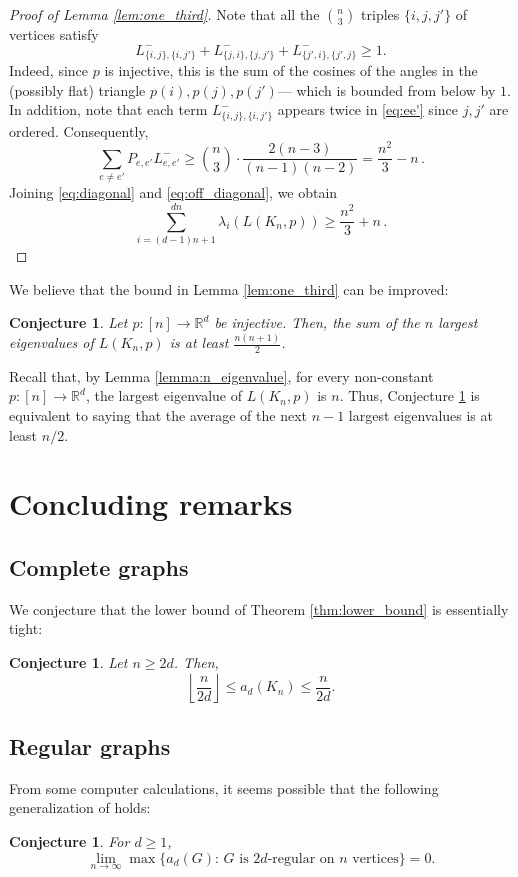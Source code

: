 \documentclass[a4paper,11pt]{article}
\theoremstyle{plain}
\newtheorem{conjecture}[theorem]{\bf Conjecture}
\theoremstyle{definition}
\newcommand{\Rea}{{\mathbb R}}
\newcommand{\lfrac}[2]{\left\lfloor\frac{#1}{#2}\right\rfloor}
\begin{document}
\begin{proof}[Proof of Lemma \ref{lem:one_third}]
Note that all the $\binom n3$ triples $\{i,j,j'\}$ of vertices satisfy
\[
L^-_{\{i,j\},\{i,j'\}}+L^-_{\{j,i\},\{j,j'\}}+L^-_{\{j',i\},\{j',j\}}\ge 1.
\]
Indeed, since $p$ is injective, this is the sum of the cosines of the angles in the (possibly flat) triangle $p(i),p(j),p(j')$--- which is bounded from below by $1$. In addition, note that each term $L^-_{\{i,j\},\{i,j'\}}$ appears twice in \eqref{eq:ee'} since $j,j'$ are ordered. Consequently,
\begin{equation}
\sum_{e\ne e'}P_{e,e'}L^-_{e,e'}\ge \binom{n}3 \cdot \frac{2(n-3)}{(n-1)(n-2)}=\frac{n^2}{3}-n\,.
\label{eq:off_diagonal}    
\end{equation}
Joining \eqref{eq:diagonal} and \eqref{eq:off_diagonal}, we obtain
\[
\sum_{i=(d-1)n+1}^{dn}\lambda_{i}(L(K_n,p))\geq 
\frac {n^2}3+n\,.
\]
\end{proof}


We believe that the bound in Lemma \ref{lem:one_third} can be improved:

\begin{conjecture}\label{conj:large_eigenvalues}
Let $p:[n]\to\Rea^d$ be injective. Then, the sum of the $n$ largest eigenvalues of $L(K_n,p)$ is at least $\frac{n(n+1)}{2}$.
\end{conjecture}

Recall that, by Lemma \ref{lemma:n_eigenvalue}, for every non-constant $p:[n]\to \Rea^d$, the largest eigenvalue of $L(K_n,p)$ is $n$. Thus, Conjecture \ref{conj:large_eigenvalues} is equivalent to saying that the average of the next $n-1$ largest eigenvalues is at least $n/2$.




\section{Concluding remarks}\label{sec:conclude}

\subsection{Complete graphs}

We conjecture that the lower bound of Theorem \ref{thm:lower_bound} is essentially tight: 
\begin{conjecture}
Let $n\geq 2d$. Then, 
\[
\lfrac{n}{2d}\leq a_d(K_n)\leq \frac{n}{2d}.
\]
\end{conjecture}
 
\subsection{Regular graphs}
From some computer calculations, it seems possible that the following generalization of \cite[Conj. 2]{jordan2020rigidity} holds:
\begin{conjecture}
For $d\geq 1$,
\[
    \lim_{n\to\infty} \max\{ a_d(G) :\, G \text{ is $2d$-regular on $n$ vertices}\}=0.
\]
\end{conjecture}
\end{document}
